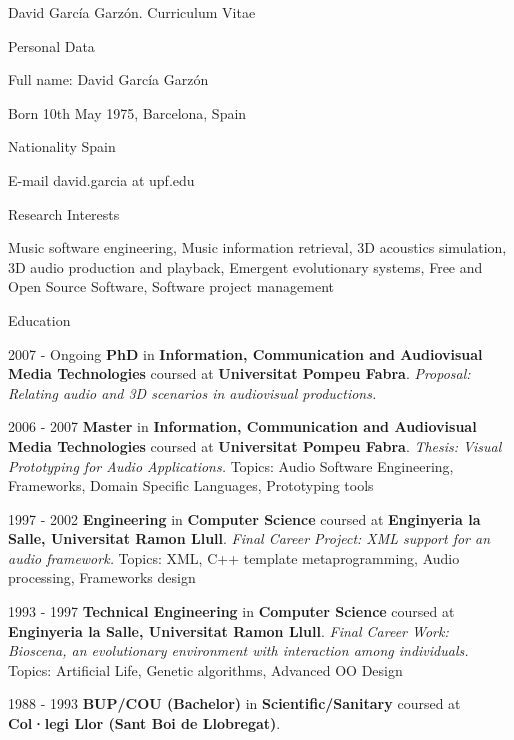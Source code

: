 \documentclass{article}
\begin{document}
\setlength{\cvlabelwidth}{45mm}

\begin{cv}{David García Garzón. Curriculum Vitae}

\begin{cvlist}{Personal Data}
\item[Full name:] David García Garzón
\item[Born] 10th May 1975, Barcelona, Spain
\item[Nationality] Spain
\item[E-mail] david.garcia at upf.edu
\end{cvlist}

\begin{cvlist}{Research Interests}
\item[] Music software engineering, Music information retrieval, 3D acoustics simulation, 3D audio production and playback, Emergent evolutionary systems, Free and Open Source Software, Software project management
\end{cvlist}

\begin{cvlist}{Education}

\item[2007 - Ongoing]
{\bf PhD} in {\bf Information, Communication and Audiovisual Media Technologies}
coursed at {\bf Universitat Pompeu Fabra}.
{\em Proposal: Relating audio and 3D scenarios in audiovisual productions.}
\item[2006 - 2007]
{\bf Master} in {\bf Information, Communication and Audiovisual Media Technologies}
coursed at {\bf Universitat Pompeu Fabra}.
{\em Thesis: Visual Prototyping for Audio Applications.}
Topics: Audio Software Engineering, Frameworks, Domain Specific Languages, Prototyping tools
\item[1997 - 2002]
{\bf Engineering} in {\bf Computer Science}
coursed at {\bf Enginyeria la Salle, Universitat Ramon Llull}.
{\em Final Career Project: XML support for an audio framework.}
Topics: XML, C++ template metaprogramming, Audio processing, Frameworks design
\item[1993 - 1997]
{\bf Technical Engineering} in {\bf Computer Science}
coursed at {\bf Enginyeria la Salle, Universitat Ramon Llull}.
{\em Final Career Work: Bioscena, an evolutionary environment with interaction among individuals.}
Topics: Artificial Life, Genetic algorithms, Advanced OO Design
\item[1988 - 1993]
{\bf BUP/COU (Bachelor)} in {\bf Scientific/Sanitary}
coursed at {\bf Col·legi Llor (Sant Boi de Llobregat)}.
{\em }
\end{cvlist}


\end{cv}
\end{document}
